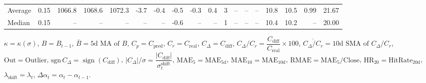 \begin{threeparttable}
{\begin{tabular}{lrrrrrrrrrrrrrrrrr}
Average &     0.15 & 1066.8 & 1068.6 & 1072.3 &       -3.7 &           -0.4 &                      -0.5 &                     -0.3 &                 0.4 &              3 &         -- &        -- &             -- &             10.8 &                10.5 &            0.99 &                  21.67 \\
 Median &     0.15 &     -- &     -- &     -- &         -- &             -- &                      -0.6 &                       -- &                  -- &              1 &         -- &        -- &             -- &             10.4 &                10.2 &              -- &                  20.00 \\
\bottomrule
\end{tabular}
}
\begin{tablenotes}\footnotesize
\item $\kappa=\kappa(\sigma)$, $B=B_{t-1}$, $\overline{B}=\text{5d MA of }B$, $C_p=C_{\text{pred}}$, $C_r=C_{\text{real}}$, $C_\Delta=C_{\text{diff}}$, $C_\Delta/C_r=\dfrac{C_{\text{diff}}}{C_{\text{real}}}\times100$, $\overline{C_\Delta/C_r}=\text{10d SMA of }C_\Delta/C_r$, $\mathrm{Out}=\text{Outlier}$, $\mathrm{sgn}\,C_\Delta=\operatorname{sign}(C_{\text{diff}})$, $|C_\Delta|/\sigma=\dfrac{|C_{\text{diff}}|}{\sigma_t^{\text{shift}}}$, $\mathrm{MAE}_5=\mathrm{MAE}_{5\text{d}}$, $\mathrm{MAE}_{10}=\mathrm{MAE}_{10\text{d}}$, $\mathrm{RMAE}= \mathrm{MAE}_5 / \text{Close}$, $\mathrm{HR}_{20}=\mathrm{HitRate}_{20\text{d}}$, $\lambda_{\text{shift}}=\lambda_t$, $\Delta\alpha_t=\alpha_t-\alpha_{t-1}$.
\end{tablenotes}
\end{threeparttable}
\endgroup

